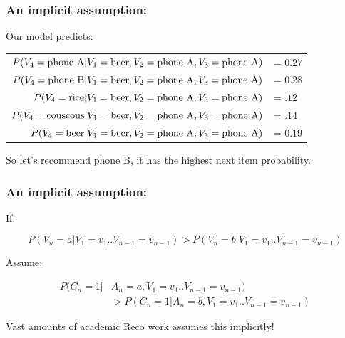  \begin{frame}
  \frametitle{An implicit assumption:}

Our model predicts:
  \begin{tabular}{r l}
    $P(V_4={\rm phone ~ A} |V_1 = {\rm beer}, V_2 = {\rm phone ~ A}, V_3 = {\rm phone ~ A} )$ &= $0.27$ \\
    $P(V_4={\rm phone ~ B} |V_1 = {\rm beer}, V_2 = {\rm phone ~ A}, V_3 = {\rm phone ~ A} )$ &= $0.28$ \\
    $P(V_4={\rm rice} |V_1 = {\rm beer}, V_2 = {\rm phone ~ A}, V_3 = {\rm phone ~ A} )$ &= $.12$ \\
    $P(V_4={\rm couscous} |V_1 = {\rm beer}, V_2 = {\rm phone ~ A}, V_3 = {\rm phone ~ A} )$ &= $.14$ \\
    $P(V_4={\rm beer} |V_1 = {\rm beer}, V_2 = {\rm phone ~ A}, V_3 = {\rm phone ~ A} )$ &= $0.19$ \\
  \end{tabular}

So let's recommend phone B, it has the highest next item probability.

\end{frame}

 \begin{frame}
  \frametitle{An implicit assumption:}
If: \pause

\[
P(V_n=a|V_1=v_1..V_{n-1}=v_{n-1}) > P(V_n=b|V_1=v_1..V_{n-1}=v_{n-1})
\]    

\pause
Assume:

\begin{align*}
P(C_n=1|&A_n=a,V_1=v_1..V_{n-1}=v_{n-1}) \\
&> P(C_n=1|A_n=b,V_1=v_1..V_{n-1}=v_{n-1})
\end{align*}

\pause
Vast amounts of academic Reco work assumes this implicitly!

 \end{frame}


